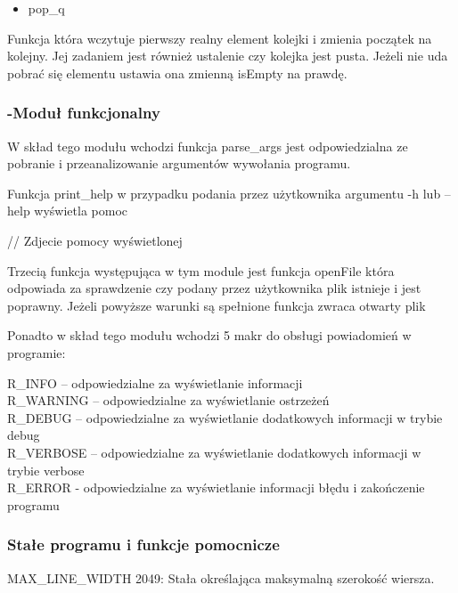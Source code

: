 \documentclass[
]{article}
\begin{document}
\begin{itemize}
\item
  pop\_q
\end{itemize}

Funkcja która wczytuje pierwszy realny element kolejki i zmienia
początek na kolejny. Jej zadaniem jest również ustalenie czy kolejka
jest pusta. Jeżeli nie uda pobrać się elementu ustawia ona zmienną
isEmpty na prawdę.

\hypertarget{moduux142-funkcjonalny}{%
\subsubsection{\texorpdfstring{-Moduł funkcjonalny
}{-Moduł funkcjonalny }}\label{moduux142-funkcjonalny}}

W skład tego modułu wchodzi funkcja parse\_args jest odpowiedzialna ze
pobranie i przeanalizowanie argumentów wywołania programu.

Funkcja print\_help w przypadku podania przez użytkownika argumentu -h
lub --help wyświetla pomoc

// Zdjecie pomocy wyświetlonej

Trzecią funkcja występująca w tym module jest funkcja openFile która
odpowiada za sprawdzenie czy podany przez użytkownika plik istnieje i
jest poprawny. Jeżeli powyższe warunki są spełnione funkcja zwraca
otwarty plik

Ponadto w skład tego modułu wchodzi 5 makr do obsługi powiadomień w
programie:

R\_INFO -- odpowiedzialne za wyświetlanie informacji\\
R\_WARNING -- odpowiedzialne za wyświetlanie ostrzeżeń\\
R\_DEBUG -- odpowiedzialne za wyświetlanie dodatkowych informacji w
trybie debug\\
R\_VERBOSE -- odpowiedzialne za wyświetlanie dodatkowych informacji w
trybie verbose\\
R\_ERROR - odpowiedzialne za wyświetlanie informacji błędu i zakończenie
programu

\hypertarget{staux142e-programu-i-funkcje-pomocnicze}{%
\subsubsection{Stałe programu i funkcje
pomocnicze}\label{staux142e-programu-i-funkcje-pomocnicze}}

MAX\_LINE\_WIDTH 2049: Stała określająca maksymalną szerokość wiersza.
\end{document}
